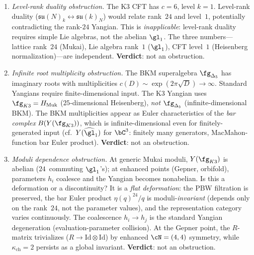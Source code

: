 \begin{remark}
\begin{enumerate}[label=\textbf{A\arabic*.}, leftmargin=2.5em]
\item \emph{Level-rank duality obstruction.}
The K3 CFT has $c = 6$, level $k = 1$.  Level-rank duality
($\mathfrak{su}(N)_k \leftrightarrow \mathfrak{su}(k)_N$) would
relate rank~$24$ and level~$1$, potentially contradicting the
rank-$24$ Yangian.  This is \emph{inapplicable}: level-rank duality
requires simple Lie algebras, not the abelian $\gl_1$.
The three numbers---lattice rank~$24$ (Mukai), Lie algebra rank~$1$
($\gl_1$), CFT level~$1$ (Heisenberg normalization)---are independent.
\textbf{Verdict}: not an obstruction.

\item \emph{Infinite root multiplicity obstruction.}
The BKM superalgebra $\fg_{\Delta_5}$ has imaginary roots with
multiplicities $c(D) \sim \exp(2\pi\sqrt{D}) \to \infty$.
Standard Yangians require finite-dimensional input.
The K3 Yangian uses $\fg_{K3} = H_{\mathrm{Muk}}$
($25$-dimensional Heisenberg), \emph{not} $\fg_{\Delta_5}$
(infinite-dimensional BKM).  The BKM multiplicities
appear as Euler characteristics of the \emph{bar complex}
$B(Y(\fg_{K3}))$, which is infinite-dimensional even for
finitely-generated input (cf.\ $Y(\widehat{\gl}_1)$ for $\bC^3$:
finitely many generators, MacMahon-function bar Euler product).
\textbf{Verdict}: not an obstruction.

\item \emph{Moduli dependence obstruction.}
At generic Mukai moduli, $Y(\fg_{K3})$ is abelian
($24$~commuting $\gl_1$'s); at enhanced points (Gepner, orbifold),
parameters $h_i$ coalesce and the Yangian becomes nonabelian.
Is this a deformation or a discontinuity?  It is a \emph{flat
deformation}: the PBW filtration is preserved, the bar Euler product
$\eta(q)^{24}/q$ is moduli-\emph{invariant}
(depends only on the rank~$24$, not the parameter values),
and the representation category varies continuously.
The coalescence $h_i \to h_j$ is the standard Yangian degeneration
(evaluation-parameter collision).  At the Gepner point, the
$R$-matrix trivializes ($R \to \mathrm{Id} \otimes \mathrm{Id}$)
by enhanced $\cN = (4,4)$ symmetry, while $\kappa_{\mathrm{ch}} = 2$
persists as a global invariant.
\textbf{Verdict}: not an obstruction.


\end{enumerate}
\end{remark}
